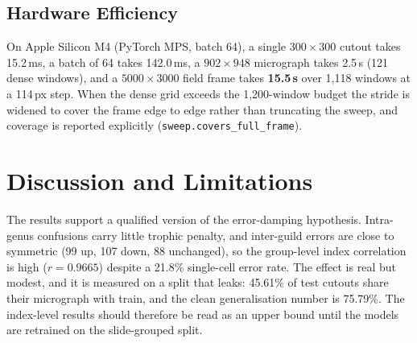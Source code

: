 \documentclass[10pt,twocolumn,a4paper]{article}
\begin{document}
\subsection{Hardware Efficiency}
On Apple Silicon M4 (PyTorch MPS, batch 64), a single $300 \times 300$ cutout takes 15.2\,ms, a batch of 64 takes 142.0\,ms, a $902 \times 948$ micrograph takes 2.5\,s (121 dense windows), and a $5000 \times 3000$ field frame takes \textbf{15.5\,s} over 1,118 windows at a 114\,px step. When the dense grid exceeds the 1,200-window budget the stride is widened to cover the frame edge to edge rather than truncating the sweep, and coverage is reported explicitly (\texttt{sweep.covers\_full\_frame}).

\section{Discussion and Limitations}

The results support a qualified version of the error-damping hypothesis. Intra-genus confusions carry little trophic penalty, and inter-guild errors are close to symmetric (99 up, 107 down, 88 unchanged), so the group-level index correlation is high ($r = 0.9665$) despite a 21.8\% single-cell error rate. The effect is real but modest, and it is measured on a split that leaks: 45.61\% of test cutouts share their micrograph with train, and the clean generalisation number is 75.79\%. The index-level results should therefore be read as an upper bound until the models are retrained on the slide-grouped split.
\end{document}
